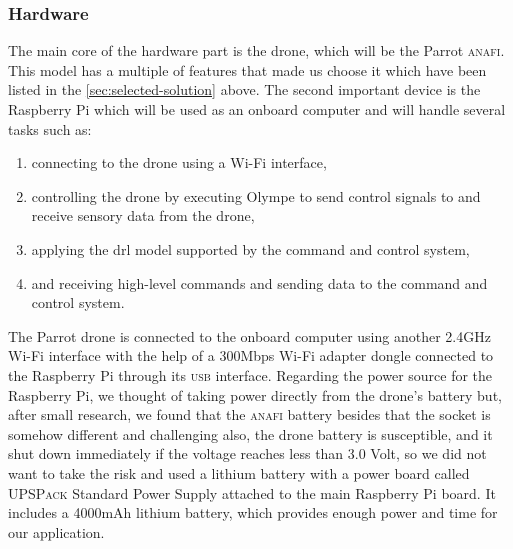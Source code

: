 \documentclass[../main.tex]{subfiles}
\begin{document}
\subsubsection{Hardware}
The main core of the hardware part is the drone, 
which will be the Parrot \textsc{anafi}. This model 
has a multiple of features that made us choose it 
which have been listed in the 
\cref{sec:selected-solution} above. 
The second important device is the Raspberry Pi 
which will be used as an onboard computer and will 
handle several tasks such as:

\begin{enumerate}
    \item connecting to the drone 
        using a Wi-Fi interface,
    \item controlling the drone 
        by executing Olympe to send control signals 
        to and receive sensory data from the drone,
    \item applying the \gls{drl} model supported by 
        the command and control system,
    \item and receiving high-level commands and 
        sending data to the command and control system.
\end{enumerate}
 
The Parrot \anafi drone is connected 
to the onboard computer using another 
2.4GHz Wi-Fi interface with the help of a 
300Mbps Wi-Fi adapter dongle connected to 
the Raspberry Pi through its \textsc{usb} interface. 
Regarding the power source for the Raspberry Pi, we thought of taking power directly from the drone's battery but, after small research, we found that the \textsc{anafi} battery besides that the socket is somehow different and challenging also, the drone battery is susceptible, and it shut down immediately if the voltage reaches less than 3.0 Volt, so we did not want to take the risk and used a 
lithium battery with a power board called 
\textsc{UPSPack} Standard Power Supply attached to 
the main Raspberry Pi board. It includes a 4000mAh 
lithium battery, which provides enough power 
and time for our application.
\end{document}
